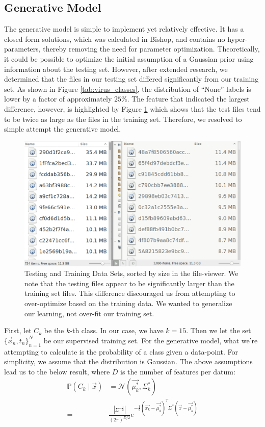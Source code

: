 \documentclass[letterpaper]{article}
\begin{document}
\subsection{Generative Model}
The generative model is simple to implement yet relatively effective. It has a closed form solutions, which was calculated in Bishop, and contains no hyper-parameters, thereby removing the need for parameter optimization. Theoretically, it could be possible to optimize the initial assumption of a Gaussian prior using information about the testing set. However, after extended research, we determined that the files in our testing set differed significantly from our training set. As shown in Figure \ref{tab:virus_classes}, the distribution of ``None'' labels is lower by a factor of approximately $25\%$. The feature that indicated the largest difference, however, is highlighted by Figure \ref{fig:file_size} which shows that the test files tend to be twice as large as the files in the training set. Therefore, we resolved to simple attempt the generative model. \\

\begin{figure}
	\centering
	\includegraphics[scale=0.2]{file_size}
    \caption{Testing and Training Data Sets, sorted by size in the file-viewer. We note that the testing files appear to be significantly larger than the training set files. This difference discouraged us from attempting to over-optimize based on the training data. We wanted to generalize our learning, not over-fit our training set.}
    \label{fig:file_size}
\end{figure}

\noindent First, let $C_k$ be the $k$-th class. In our case, we have $k = 15$. Then we let the set $\{\vec{x}_n, t_n \}_{n=1}^N$ be our supervised training set. For the generative model, what we're attempting to calculate is the probability of a class given a data-point. For simplicity, we assume that the distribution is Gaussian. The above assumptions lead us to the below result, where $D$ is the number of features per datum:  
\begin{align}
    \mathbb{P}(C_k \mid \vec{x}) &= \mathcal{N}(\vec{\mu_k^*}, \Sigma_k^*) \\
    =& \frac{|\Sigma^{-\frac{1}{2}}|}{(2\pi)^{D/2}}e^{-\frac{1}{2}(\vec{x_k} - \vec{\mu_k^*})^T \Sigma^*(\vec{x} - \vec{\mu_k^*})}
\end{align}
\end{document}
